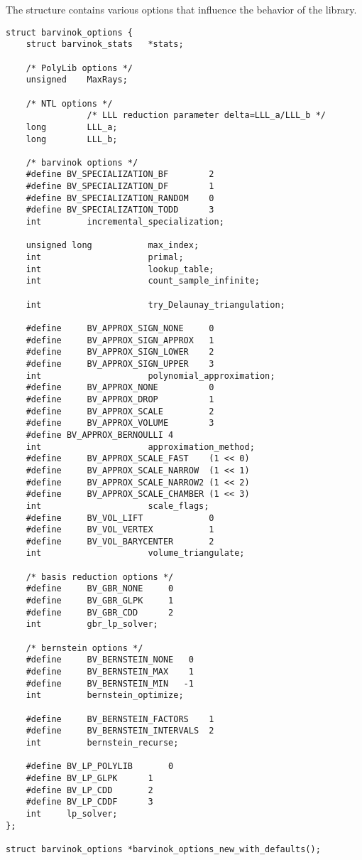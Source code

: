 The  structure contains various
options that influence the behavior of the library.

\begin{verbatim}
struct barvinok_options {
    struct barvinok_stats   *stats;

    /* PolyLib options */
    unsigned    MaxRays;

    /* NTL options */
                /* LLL reduction parameter delta=LLL_a/LLL_b */
    long        LLL_a;
    long        LLL_b;

    /* barvinok options */
    #define	BV_SPECIALIZATION_BF		2
    #define	BV_SPECIALIZATION_DF		1
    #define	BV_SPECIALIZATION_RANDOM	0
    #define	BV_SPECIALIZATION_TODD		3
    int         incremental_specialization;

    unsigned long           max_index;
    int                     primal;
    int                     lookup_table;
    int                     count_sample_infinite;

    int                     try_Delaunay_triangulation;

    #define     BV_APPROX_SIGN_NONE     0
    #define     BV_APPROX_SIGN_APPROX   1
    #define     BV_APPROX_SIGN_LOWER    2
    #define     BV_APPROX_SIGN_UPPER    3
    int                     polynomial_approximation;
    #define     BV_APPROX_NONE          0
    #define     BV_APPROX_DROP          1
    #define     BV_APPROX_SCALE         2
    #define     BV_APPROX_VOLUME        3
    #define	BV_APPROX_BERNOULLI	4
    int                     approximation_method;
    #define     BV_APPROX_SCALE_FAST    (1 << 0)
    #define     BV_APPROX_SCALE_NARROW  (1 << 1)
    #define     BV_APPROX_SCALE_NARROW2 (1 << 2)
    #define     BV_APPROX_SCALE_CHAMBER (1 << 3)
    int                     scale_flags;
    #define     BV_VOL_LIFT             0
    #define     BV_VOL_VERTEX           1
    #define     BV_VOL_BARYCENTER       2
    int                     volume_triangulate;

    /* basis reduction options */
    #define     BV_GBR_NONE     0
    #define     BV_GBR_GLPK     1
    #define     BV_GBR_CDD      2
    int         gbr_lp_solver;

    /* bernstein options */
    #define     BV_BERNSTEIN_NONE   0
    #define     BV_BERNSTEIN_MAX    1
    #define     BV_BERNSTEIN_MIN   -1
    int         bernstein_optimize;

    #define     BV_BERNSTEIN_FACTORS    1
    #define     BV_BERNSTEIN_INTERVALS  2
    int         bernstein_recurse;

    #define	BV_LP_POLYLIB		0
    #define	BV_LP_GLPK		1
    #define	BV_LP_CDD		2
    #define	BV_LP_CDDF		3
    int		lp_solver;
};

struct barvinok_options *barvinok_options_new_with_defaults();
\end{verbatim}

